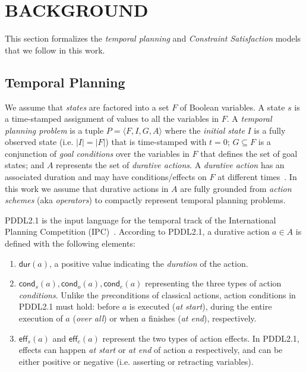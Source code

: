 \documentclass{ecai}
\newcommand{\tup}[1]{{\langle #1 \rangle}}
\newcommand{\eff}{\mathsf{eff}}    %
\newcommand{\cond}{\mathsf{cond}}  %
\newcommand{\dur}{\mathsf{dur}}    %
\begin{document}
\section{BACKGROUND}

This section formalizes the {\em temporal planning} and {\em Constraint Satisfaction} models that we follow in this work.

\subsection{Temporal Planning}
\label{sec:temporalplanning}

We assume that {\em states} are factored into a set $F$ of Boolean variables. A state $s$ is a time-stamped assignment of values to all the variables in $F$. A {\em temporal planning problem} is a tuple $P=\tup{F,I,G,A}$ where the {\em initial state} $I$ is a fully observed state (i.e. $|I|=|F|$) that is time-stamped with $t=0$; $G \subseteq F$ is a conjunction of {\em goal conditions} over the variables in $F$ that defines the set of goal states; and $A$ represents the set of {\em durative actions}. A {\em durative action} has an associated duration and may have conditions/effects on $F$ at different times~\cite{garrido2009constraint,vidal2006branching}. In this work we assume that durative actions in $A$ are fully grounded from {\em action schemes} (aka {\em operators}) to compactly represent temporal planning problems. 

PDDL2.1 is the input language for the temporal track of the International Planning Competition (IPC)~\cite{fox2003pddl2,ghallab2004automated}. According to PDDL2.1, a durative action $a\in A$ is defined with the following elements:

\begin{enumerate}
\item $\dur(a)$, a positive value indicating the {\em duration} of the action.

\item $\cond_s(a), \cond_o(a), \cond_e(a)$ representing the three types of action {\em conditions}. Unlike the \emph{pre}conditions of classical actions, action conditions in PDDL2.1 must hold: before $a$ is executed ({\em at start}), during the entire execution of $a$ ({\em over all}) or when $a$ finishes ({\em at end}), respectively. 

\item $\eff_s(a)$ and $\eff_e(a)$ represent the two types of action effects. In PDDL2.1, effects can happen {\em at start} or {\em at end} of action $a$ respectively, and can be either positive or negative (i.e. asserting or retracting variables). 

\end{enumerate}
\end{document}
